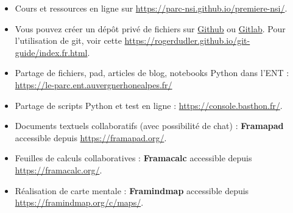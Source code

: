 \documentclass[a4paper, french, 12pt]{article}  %
\begin{document}
\begin{itemize}[label=]

\item Cours et ressources en ligne sur \url{https://parc-nsi.github.io/premiere-nsi/}.

\item Vous pouvez créer un dépôt privé de fichiers sur \href{https://github.com}{Github} ou \href{https://gitlab.com/}{Gitlab}. Pour l'utilisation de git, voir cette \url{https://rogerdudler.github.io/git-guide/index.fr.html}.


\item Partage de fichiers, pad, articles de  blog, notebooks Python  dans  l'ENT : \url{https://le-parc.ent.auvergnerhonealpes.fr/}

\item Partage de scripts Python et test en ligne : \url{https://console.basthon.fr/}.

\item Documents textuels collaboratifs (avec possibilité de chat) : \textbf{Framapad} accessible depuis  \url{https://framapad.org/}.

\item Feuilles de calculs collaboratives  : \textbf{Framacalc} accessible depuis  \url{https://framacalc.org/}.


\item Réalisation de carte mentale   : \textbf{Framindmap} accessible depuis \url{https://framindmap.org/c/maps/}.


\end{itemize}

\newpage
\end{document}
